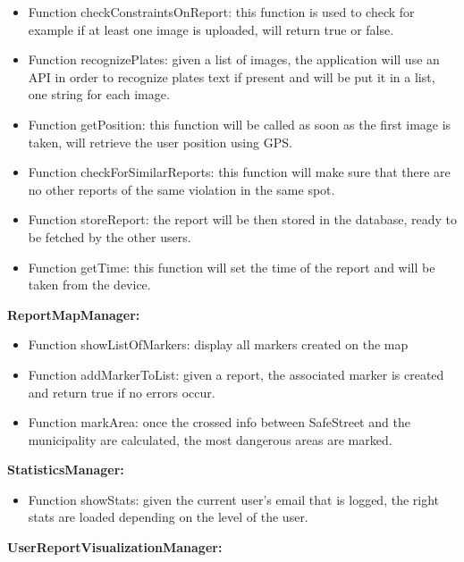 \documentclass[../RASD.tex]{subfiles}
\begin{document}
    \begin{itemize}
        \item     Function checkConstraintsOnReport: this function is used to check for example if at least one image is uploaded, will return true or false.
        \item     Function recognizePlates: given a list of images, the application will use an API in order to recognize plates text
        if present and will be put it in a list, one string for each image.
        \item     Function getPosition: this function will be called as soon as the first image is taken, will retrieve the user position using GPS.
        \item     Function checkForSimilarReports: this function will make sure that there are no other reports of the same violation in the same spot.
        \item     Function storeReport: the report will be then stored in the database, ready to be fetched by the other users.
        \item     Function getTime: this function will set the time of the report and will be taken from the device.
    \end{itemize}
    \textbf{ReportMapManager:}
    \begin{itemize}
        \item     Function showListOfMarkers: display all markers created on the map
        \item     Function addMarkerToList: given a report, the associated marker is created and return true if no errors occur.
        \item     Function markArea: once the crossed info between SafeStreet and the municipality are calculated, the most dangerous areas are marked.
    \end{itemize}
    \textbf{StatisticsManager:}
    \begin{itemize}
        \item     Function showStats: given the current user’s email that is logged, the right stats are loaded depending on the level of the user.
    \end{itemize}
    \textbf{UserReportVisualizationManager:}
\end{document}
